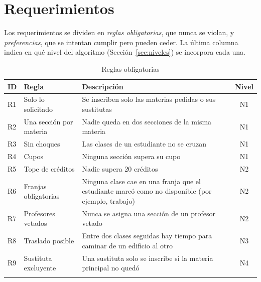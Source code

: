 \documentclass[pdflatex,sn-mathphys-num]{sn-jnl}%
\begin{document}
\section{Requerimientos}\label{sec:req}

Los requerimientos se dividen en \emph{reglas obligatorias}, que nunca se violan, y \emph{preferencias}, que se intentan cumplir pero pueden ceder. La última columna indica en qué nivel del algoritmo (Sección~\ref{sec:niveles}) se incorpora cada una.

\begin{table}[hbtp]
\caption{Reglas obligatorias}\label{tab:reglas}
\small
\begin{tabularx}{\textwidth}{@{}llLc@{}}
\toprule
ID & Regla & Descripción & Nivel \\
\midrule
R1 & Solo lo solicitado & Se inscriben solo las materias pedidas o sus sustitutas & N1 \\
R2 & Una sección por materia & Nadie queda en dos secciones de la misma materia & N1 \\
R3 & Sin choques & Las clases de un estudiante no se cruzan & N1 \\
R4 & Cupos & Ninguna sección supera su cupo & N1 \\
R5 & Tope de créditos & Nadie supera 20 créditos & N2 \\
R6 & Franjas obligatorias & Ninguna clase cae en una franja que el estudiante marcó como no disponible (por ejemplo, trabajo) & N2 \\
R7 & Profesores vetados & Nunca se asigna una sección de un profesor vetado & N2 \\
R8 & Traslado posible & Entre dos clases seguidas hay tiempo para caminar de un edificio al otro & N3 \\
R9 & Sustituta excluyente & Una sustituta solo se inscribe si la materia principal no quedó & N4 \\
\botrule
\end{tabularx}
\end{table}
\end{document}
